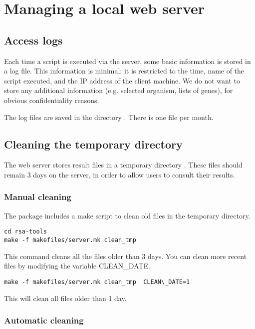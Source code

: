 \documentclass{article}
\begin{document}
\section{Managing a local web server}

\subsection{Access logs}

Each time a script is executed via the \RSAT server, some basic
information is stored in a log file. This information is minimal: it
is restricted to the time, name of the script executed, and the IP
address of the client machine. We do not want to store any additional
information (e.g. selected organism, lists of genes), for obvious
confidentiality reasons.

The log files are saved in the directory . There
is one file per month.


\subsection{Cleaning the temporary directory}

The web server stores result files in a temporary directory
. These files should remain 3 days on
the server, in order to allow users to consult their results.

\subsubsection{Manual cleaning}

The \RSAT package includes a make script to clean old files in the
temporary directory.

\begin{verbatim}
cd rsa-tools
make -f makefiles/server.mk clean_tmp
\end{verbatim}

This command cleans all the files older than 3 days. You can clean
more recent files by modifying the variable CLEAN\_DATE.

\begin{verbatim}
make -f makefiles/server.mk clean_tmp  CLEAN\_DATE=1
\end{verbatim}

This will clean all files older than 1 day.

\subsubsection{Automatic cleaning}
\end{document}
